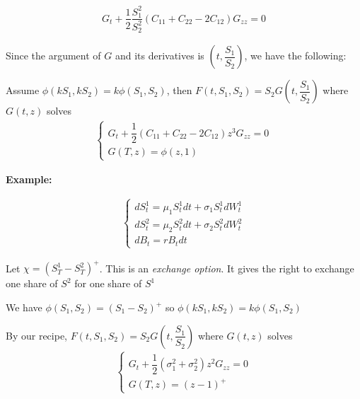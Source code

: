 \begin{equation*}
  \begin{gathered}
    G_t+\dfrac{1}{2}\dfrac{S_1^2}{S_2^2}\left(C_{11}+C_{22}-2C_{12}\right)G_{zz} = 0
  \end{gathered}
\end{equation*}
\par\bigskip
\noindent Since the argument of $G$ and its derivatives is $\left(t,\dfrac{S_1}{S_2}\right)$, we have the following:
\par\bigskip
\begin{lem}[]{}
  Assume $\phi(kS_1,kS_2) = k\phi(S_1,S_2)$, then $F(t,S_1,S_2) = S_2G\left(t,\dfrac{S_1}{S_2}\right)$ where $G(t,z)$ solves
  \begin{equation*}
    \begin{gathered}
      \begin{cases}
        G_t+\dfrac{1}{2}\left(C_{11}+C_{22}-2C_{12}\right)z^3G_{zz}=0\\
        G(T,z) = \phi(z,1)
      \end{cases}
    \end{gathered}
  \end{equation*}
\end{lem}
\par\bigskip
\noindent\textbf{Example:}\par
\begin{equation*}
  \begin{gathered}
    \begin{cases}
      dS_t^1 = \mu_1S_t^1dt+\sigma_1S_t^1dW_t^1\\
      dS_t^2=\mu_2S_t^2dt+\sigma_2S_t^2dW_t^2\\
      dB_t = rB_tdt
    \end{cases}
  \end{gathered}
\end{equation*}\par
\noindent Let $\chi = \left(S_T^1-S_T^2\right)^+$. This is an \textit{exchange option}. It gives the right to exchange one share of $S^2$ for one share of $S^1$\par
\noindent We have $\phi(S_1,S_2) = (S_1-S_2)^+$ so $\phi(kS_1,kS_2) = k\phi(S_1,S_2)$\par
\noindent By our recipe, $F(t,S_1,S_2) = S_2G\left(t,\dfrac{S_1}{S_2}\right)$ where $G(t,z)$ solves
\begin{equation*}
  \begin{gathered}
    \begin{cases}
      G_t+\dfrac{1}{2}\left(\sigma_1^2+\sigma_2^2\right)z^2G_{zz}=0\\
      G(T,z) = (z-1)^+
    \end{cases}
  \end{gathered}
\end{equation*}\par
